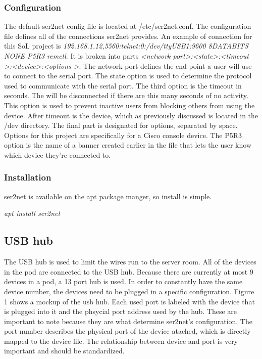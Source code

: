 \documentclass[12pt]{IEEEtran}
\begin{document}
\subsubsection{Configuration}
The default ser2net config file is located at /etc/ser2net.conf.
The configuration file defines all of the connections ser2net provides.
An example of connection for this SoL project is \textit{192.168.1.12,5560:telnet:0:/dev/ttyUSB1:9600 8DATABITS NONE P5R3 remctl}.
It is broken into parts \textit{\textless network port\textgreater :\textless state\textgreater :\textless timeout \textgreater :\textless device\textgreater :\textless options \textgreater}.
The network port defines the end point a user will use to connect to the serial port.
The state option is used to determine the protocol used to communicate with the serial port.
The third option is the timeout in seconds.
The will be disconnected if there are this many seconds of no activity.  
This option is used to prevent inactive users from blocking others from using the device.
After timeout is the device, which as previously discussed is located in the /dev directory.
The final part is designated for options, separated by space.
Options for this project are specifically for a Cisco console device.
The P5R3 option is the name of a banner created earlier in the file that lets the user know which device they're connected to. 

\subsubsection{Installation}
ser2net is available on the apt package manger, so install is simple.

\textit{apt install ser2net}
\subsection{USB hub}
The USB hub is used to limit the wires run to the server room.
All of the devices in the pod are connected to the USB hub.
Because there are currently at most 9 devices in a pod, a 13 port hub is used.
In order to constantly have the same device number, the devices need to be plugged in a specific configuration.
Figure 1 shows a mockup of the usb hub.
Each used port is labeled with the device that is plugged into it and the phsycial port address used by the hub.
These are important to note because they are what determine ser2net's configuration.
The port number describes the physical port of the device atached, which is directly mapped to the device file.
The relationship between device and port is very important and should be standardized.
\end{document}
